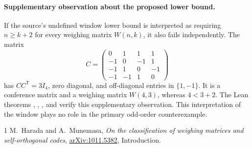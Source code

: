 \documentclass[10pt]{article}
\begin{document}
\paragraph{Supplementary observation about the proposed lower bound.}
If the source's undefined window lower bound is interpreted as requiring $n\ge k+2$ for every weighing matrix $W(n,k)$, it also fails independently. The matrix
\[
C=\begin{pmatrix}
0&1&1&1\\
-1&0&-1&1\\
-1&1&0&-1\\
-1&-1&1&0
\end{pmatrix}
\]
has $CC^{\mathsf T}=3I_4$, zero diagonal, and off-diagonal entries in $\{1,-1\}$. It is a conference matrix and a weighing matrix $W(4,3)$, whereas $4<3+2$. The Lean theorems , , , and  verify this supplementary observation. This interpretation of the window plays no role in the primary odd-order counterexample.

\begin{thebibliography}{1}
M.~Harada and A.~Munemasa,
\emph{On the classification of weighing matrices and self-orthogonal codes},
\href{https://arxiv.org/abs/1011.5382}{arXiv:1011.5382}, Introduction.
\end{thebibliography}
\end{document}
